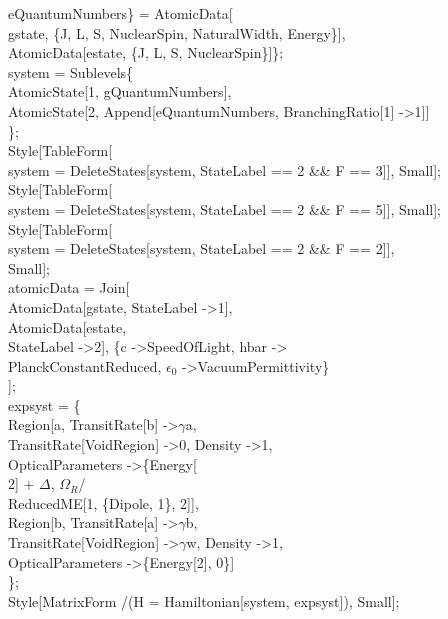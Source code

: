    eQuantumNumbers\} = {AtomicData[\\
    gstate, \{J, L, S, NuclearSpin, NaturalWidth, Energy\}],\\
   AtomicData[estate, \{J, L, S, NuclearSpin\}]\};\\
system = Sublevels\@\{\\
    AtomicState[1, gQuantumNumbers], \\
    AtomicState[2, Append[eQuantumNumbers, BranchingRatio[1] -\textgreater 1]]\\
    \};\\
Style[TableForm[\\
   system = DeleteStates[system, StateLabel == 2 \&\& F == 3]], Small];\\
Style[TableForm[\\
   system = DeleteStates[system, StateLabel == 2 \&\& F == 5]], Small];\\
Style[TableForm[\\
   system = DeleteStates[system, StateLabel == 2 \&\& F == 2]],\\
  Small];\\
atomicData = Join[\\
   AtomicData[gstate, StateLabel -\textgreater 1],\\
   AtomicData[estate, \\
    StateLabel -\textgreater 2], \{c -\textgreater SpeedOfLight, hbar -\textgreater \\
     PlanckConstantReduced, $\epsilon_0$ -\textgreater VacuumPermittivity\}\\
   ];\\
expsyst = \{\\
   Region[a, TransitRate[b] -\textgreater $\gamma$a, \\
    TransitRate[VoidRegion] -\textgreater 0, Density -\textgreater 1, \\
    OpticalParameters -\textgreater \{Energy[\\
        2] + $\Delta$, $\Omega_R$/\\
       ReducedME[1, \{Dipole, 1\}, 2]}],\\
   Region[b, TransitRate[a] -\textgreater $\gamma$b, \\
    TransitRate[VoidRegion] -\textgreater $\gamma$w, Density -\textgreater 1, \\
    OpticalParameters -\textgreater \{Energy[2], 0\}]\\
   \};\\
Style[MatrixForm /\@ (H = Hamiltonian[system, expsyst]), Small];\\

